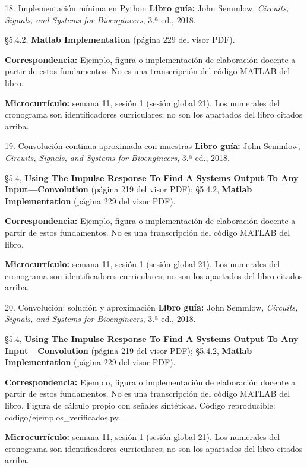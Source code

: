 \documentclass[
  10pt,
  ignorenonframetext,
  aspectratio=169,
  spanish,
]{beamer}
\begin{document}
\begin{frame}{18. Implementación mínima en Python}
\label{implementaciuxf3n-muxednima-en-python}
\textbf{Libro guía:} John Semmlow, \emph{Circuits, Signals, and Systems
for Bioengineers}, 3.ª ed., 2018.

§5.4.2, \textbf{Matlab Implementation} (página 229 del visor PDF).

\textbf{Correspondencia:} Ejemplo, figura o implementación de
elaboración docente a partir de estos fundamentos. No es una
transcripción del código MATLAB del libro.

\textbf{Microcurrículo:} semana 11, sesión 1 (sesión global 21). Los
numerales del cronograma son identificadores curriculares; no son los
apartados del libro citados arriba.
\end{frame}

\begin{frame}{19. Convolución continua aproximada con muestras}
\label{convoluciuxf3n-continua-aproximada-con-muestras}
\textbf{Libro guía:} John Semmlow, \emph{Circuits, Signals, and Systems
for Bioengineers}, 3.ª ed., 2018.

§5.4, \textbf{Using The Impulse Response To Find A Systems Output To Any
Input---Convolution} (página 219 del visor PDF); §5.4.2, \textbf{Matlab
Implementation} (página 229 del visor PDF).

\textbf{Correspondencia:} Ejemplo, figura o implementación de
elaboración docente a partir de estos fundamentos. No es una
transcripción del código MATLAB del libro.

\textbf{Microcurrículo:} semana 11, sesión 1 (sesión global 21). Los
numerales del cronograma son identificadores curriculares; no son los
apartados del libro citados arriba.
\end{frame}

\begin{frame}{20. Convolución: solución y aproximación}
\label{convoluciuxf3n-soluciuxf3n-y-aproximaciuxf3n}
\textbf{Libro guía:} John Semmlow, \emph{Circuits, Signals, and Systems
for Bioengineers}, 3.ª ed., 2018.

§5.4, \textbf{Using The Impulse Response To Find A Systems Output To Any
Input---Convolution} (página 219 del visor PDF); §5.4.2, \textbf{Matlab
Implementation} (página 229 del visor PDF).

\textbf{Correspondencia:} Ejemplo, figura o implementación de
elaboración docente a partir de estos fundamentos. No es una
transcripción del código MATLAB del libro. Figura de cálculo propio con
señales sintéticas. Código reproducible:
codigo/ejemplos\_verificados.py.

\textbf{Microcurrículo:} semana 11, sesión 1 (sesión global 21). Los
numerales del cronograma son identificadores curriculares; no son los
apartados del libro citados arriba.
\end{frame}
\end{document}
